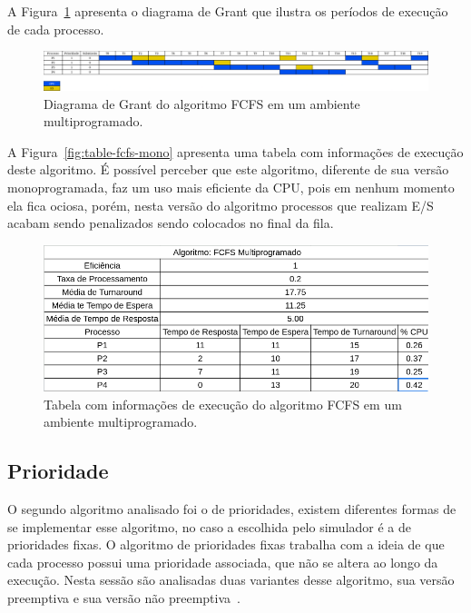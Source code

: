 \documentclass[
	12pt,				%
	oneside,   	        %
	a4paper,			%
	english,			%
	french,				%
	spanish,			%
	brazil,				%
	]{pacotes/abntex2}
\begin{document}
A Figura~\ref{fig:fcfs-multi} apresenta o diagrama de Grant que ilustra os períodos de execução de cada processo.

\begin{figure}[H]
  \centering
  \includegraphics[scale=0.20]{figuras/ex1/fifo-multi.png}
  \caption{Diagrama de Grant do algoritmo FCFS em um ambiente multiprogramado.}
  \label{fig:fcfs-multi}
\end{figure}

A Figura~\ref{fig:table-fcfs-mono} apresenta uma tabela com informações de execução deste algoritmo. É possível perceber que este algoritmo, diferente de sua versão monoprogramada, faz um uso mais eficiente da CPU, pois em nenhum momento ela fica ociosa, porém, nesta versão do algoritmo processos que realizam E/S acabam sendo penalizados sendo colocados no final da fila.

\begin{figure}[H]
  \centering
  \includegraphics[scale=0.5]{figuras/ex1/table-fifo-multi.png}
  \caption{Tabela com informações de execução do algoritmo FCFS em um ambiente multiprogramado.}
  \label{fig:table-fcfs-multi}
\end{figure}

\subsection{Prioridade}
\label{subsec:prio}

O segundo algoritmo analisado foi o de prioridades, existem diferentes formas de se implementar esse algoritmo, no caso a escolhida pelo simulador é a de prioridades fixas. O algoritmo de prioridades fixas trabalha com a ideia de que cada processo possui uma prioridade associada, que não se altera ao longo da execução. Nesta sessão são analisadas duas variantes desse algoritmo, sua versão preemptiva e sua versão não preemptiva~\cite{maziero2019}.
\end{document}
